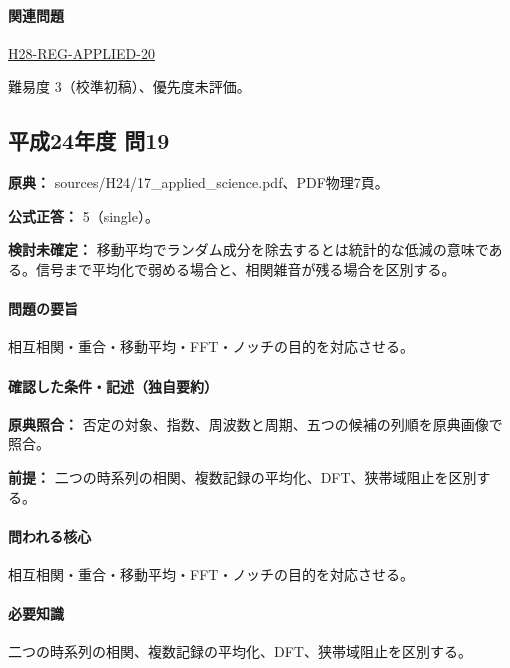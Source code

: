 \paragraph{関連問題} \hyperref[q:h28-reg-applied-20]{H28-REG-APPLIED-20}

\par 難易度 3（校準初稿）、優先度未評価。

\subsection{平成24年度 問19}
\label{q:h24-reg-applied-19}

\noindent\textbf{原典：} sources/H24/17\_applied\_science.pdf、PDF物理7頁。

\textbf{公式正答：} 5（single）。

\par\textbf{検討未確定：} 移動平均でランダム成分を除去するとは統計的な低減の意味である。信号まで平均化で弱める場合と、相関雑音が残る場合を区別する。

\paragraph{問題の要旨} 相互相関・重合・移動平均・FFT・ノッチの目的を対応させる。

\paragraph{確認した条件・記述（独自要約）}\mbox{}\par

\noindent\textbf{原典照合：} 否定の対象、指数、周波数と周期、五つの候補の列順を原典画像で照合。\par

\noindent\textbf{前提：} 二つの時系列の相関、複数記録の平均化、DFT、狭帯域阻止を区別する。\par

\paragraph{問われる核心} 相互相関・重合・移動平均・FFT・ノッチの目的を対応させる。

\paragraph{必要知識} 二つの時系列の相関、複数記録の平均化、DFT、狭帯域阻止を区別する。

